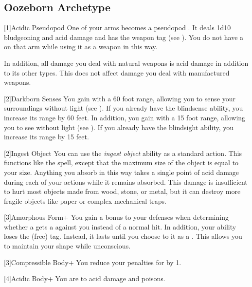     \subsection{Oozeborn Archetype}

        [1]{Acidic Pseudopod} One of your arms becomes a pseudopod .
        It deals 1d10 bludgeoning and acid damage and has the  weapon tag (see ).
        You do not have a  on that arm while using it as a weapon in this way.

        In addition, all damage you deal with natural weapons is acid damage in addition to its other types.
        This does not affect damage you deal with manufactured weapons.

        [2]{Darkborn Senses} You gain  with a 60 foot range, allowing you to sense your surroundings without light (see ).
        If you already have the blindsense ability, you increase its range by 60 feet.
        In addition, you gain  with a 15 foot range, allowing you to see without light (see ).
        If you already have the blindsight ability, you increase its range by 15 feet.

        [2]{Ingest Object} You can use the \textit{ingest object} ability as a standard action.
        This functions like the  spell, except that the maximum size of the object is equal to your size.
        Anything you absorb in this way takes a single point of  acid damage during each of your actions while it remains absorbed.
        This damage is insufficient to hurt most objects made from wood, stone, or metal, but it can destroy more fragile objects like paper or complex mechanical traps.

        [3]{Amorphous Form+} You gain a  bonus to your defenses when determining whether a  gets a  against you instead of a normal hit.
        In addition, your  ability loses the  (free) tag.
        Instead, it lasts until you choose to  it as a .
        This allows you to maintain your shape while unconscious.

        [3]{Compressible Body+} You reduce your penalties for \squeezing by 1.

        [4]{Acidic Body+} You are  to acid damage and poisons.

